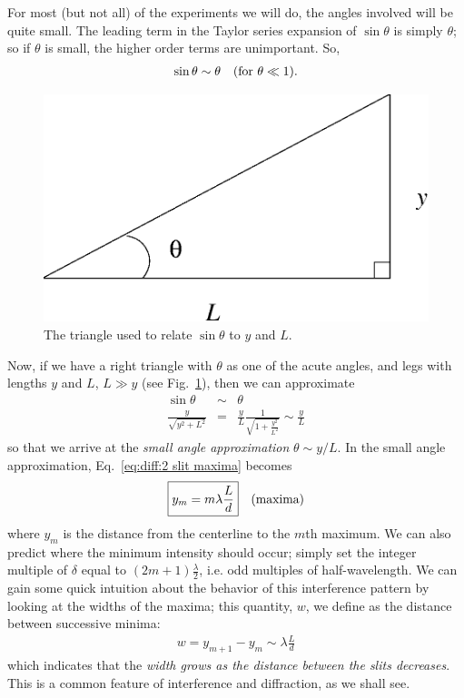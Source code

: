 For most (but not all) of the experiments we will do, the angles involved will be quite 
small.  The leading term in the Taylor series expansion of 
$\sin \theta$ is simply $\theta$; so if $\theta$ is small, the higher order 
terms are unimportant. So,
\begin{eqnarray*}
\sin \theta \sim \theta~~~{\rm (\mbox{for }\theta \ll 1)}.
\end{eqnarray*}
\begin{figure}[htb]
\centering 
\epsfxsize=4cm \includegraphics[scale=0.6]{10_diffraction/triangle.eps}
\caption{The triangle used to relate $\sin\theta$ to $y$ and $L$.} 
\label{fig:diff:triangle}
\end{figure}
Now, if we have a right triangle with $\theta$ as one of the acute angles, and
legs with lengths $y$ and $L$, $L \gg y$ (see Fig.~\ref{fig:diff:triangle}), 
then we can approximate
\begin{eqnarray*}
\sin \theta &\sim& \theta \\
\frac{y}{\sqrt{y^2+L^2}} &=& \frac{y}{L}
\frac{1}{\sqrt{1+\frac{y^2}{L^2}}}
\sim \frac{y}{L}
\end{eqnarray*}
so that we arrive at the {\em small angle approximation} $\theta \sim y/L$.
In the small angle approximation, Eq.~\ref{eq:diff:2 slit maxima}
becomes
\begin{eqnarray}
\fbox{$ \displaystyle y_m=m \lambda \frac{L}{d} $}~~~{\rm (maxima)}
\end{eqnarray}
where $y_m$ is the distance from the centerline to the $m$th maximum.
We can also predict where the minimum intensity should occur; simply set
the integer multiple of $\delta$ equal to $(2m+1) \frac{\lambda}{2}$,
i.e. odd multiples of half-wavelength.
We can gain some quick intuition about the behavior of this interference 
pattern by looking at the widths of the maxima; this quantity, $w$, 
we define as the distance between successive minima:
\begin{eqnarray*}
w = y_{m+1}-y_m \sim \lambda \frac{L}{d}
\end{eqnarray*}
which indicates that the {\it width grows as the distance between the slits 
decreases}. This is a common feature of interference and 
diffraction, as we shall see.

